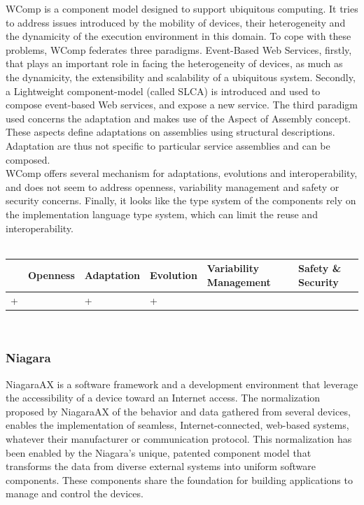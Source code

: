 WComp\cite{Ferry:2011uq,Tigli:2009} is a component model designed to support ubiquitous computing. It tries to address issues introduced by the mobility of devices, their heterogeneity and the dynamicity of the execution environment in this domain. To cope with these problems, WComp federates three paradigms. Event-Based Web Services, firstly, that plays an important role in facing the heterogeneity of devices, as much as the dynamicity, the extensibility and scalability of a ubiquitous system. Secondly, a Lightweight component-model (called SLCA) is introduced and used to compose event-based Web services, and expose a new service. The third paradigm used concerns the adaptation and makes use of the Aspect of Assembly concept. These aspects define adaptations on assemblies using structural descriptions. Adaptation are thus not specific to particular service assemblies and can be composed.\\

WComp offers several mechanism for adaptations, evolutions and interoperability,  and does not seem to address openness, variability management and safety or security concerns. Finally, it looks like the type system of the components rely on the implementation language type system, which can limit the reuse and interoperability.\\
 \\
\begin{tabular}{ >{\centering}m{}| >{\centering}m{} >{\centering}m{}| >{\centering}m{} >{\centering}m{}| >{\centering\arraybackslash}m{}}
{\tiny Interoperability} & {\tiny Openness} & {\tiny Adaptation} & {\tiny Evolution} & {\tiny Variability Management} & {\tiny Safety \& Security}\\
 \hline
 + &  & + & + &  & \\ 
  \hline
\end{tabular}\\

\subsubsection{Niagara}

NiagaraAX is a software framework and a development environment that leverage the accessibility of a device toward an Internet access. 
The normalization proposed by NiagaraAX of the behavior and data gathered from several devices, enables the implementation of seamless, Internet-connected, web-based systems, whatever their manufacturer or communication protocol. This normalization has been enabled by the Niagara's unique, patented component model that transforms the data from diverse external systems into uniform software components.
These components share the foundation for building applications to manage and control the devices.\\

